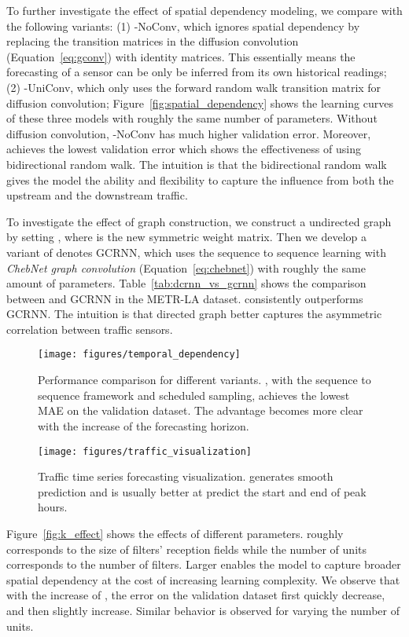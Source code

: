 To further investigate the effect of spatial dependency modeling, we compare \gcrnn{} with the following variants:
(1) \gcrnn{}-NoConv, which ignores spatial dependency by replacing the transition matrices in the diffusion convolution (Equation~\ref{eq:gconv}) with identity matrices. This essentially means the forecasting of a sensor can be only be inferred from its own historical readings;
(2) \gcrnn{}-UniConv, which only uses the forward random walk transition matrix for diffusion convolution;
Figure~\ref{fig:spatial_dependency} shows the learning curves of these three models with roughly the same number of parameters.
Without diffusion convolution, \gcrnn{}-NoConv has much higher validation error. Moreover, \gcrnn{} achieves the lowest validation error which shows the effectiveness of using bidirectional random walk.
The intuition is that the bidirectional random walk gives the model the ability and flexibility to capture the influence from both the upstream and the downstream traffic.

To investigate the effect of graph construction, we construct a undirected graph by setting , where  is the new symmetric weight matrix.
Then we develop a variant of \gcrnn{} denotes GCRNN, which uses the sequence to sequence learning with \emph{ChebNet graph convolution} (Equation~\ref{eq:chebnet}) with roughly the same amount of parameters.
Table~\ref{tab:dcrnn_vs_gcrnn} shows the comparison between \gcrnn{} and GCRNN in the METR-LA dataset.
\gcrnn{} consistently outperforms GCRNN. The intuition is that directed graph better captures the asymmetric correlation between traffic sensors.  
\begin{figure*}[tp]
    \centering
	\begin{minipage}{.43\textwidth}
	\centering
\texttt{[image: figures/temporal\_dependency]}
    \caption{Performance comparison for different \gcrnn{} variants. \gcrnn{}, with the sequence to sequence framework and scheduled sampling, achieves the lowest MAE on the validation dataset. The advantage becomes more clear with the increase of the forecasting horizon.}
    \label{fig:seq2seq_comparison}
	\end{minipage}
\hspace{0.01\textwidth}
	\begin{minipage}{.52\textwidth}
	\centering
\texttt{[image: figures/traffic\_visualization]}
\caption{Traffic time series forecasting visualization. \gcrnn{} generates smooth prediction and is usually better at predict the start and end of peak hours.}
	\label{fig:traffic_visualization}
	\end{minipage} 
\end{figure*}
Figure~\ref{fig:k_effect} shows the effects of different parameters. 
 roughly corresponds to the size of filters' reception fields while the number of units corresponds to the number of filters. 
Larger  enables the model to capture broader spatial dependency at the cost of increasing learning complexity. We observe that with the increase of , the error on the validation dataset first quickly decrease, and then slightly increase.
Similar behavior is observed for varying the number of units.
\vspace{-0.1in}
